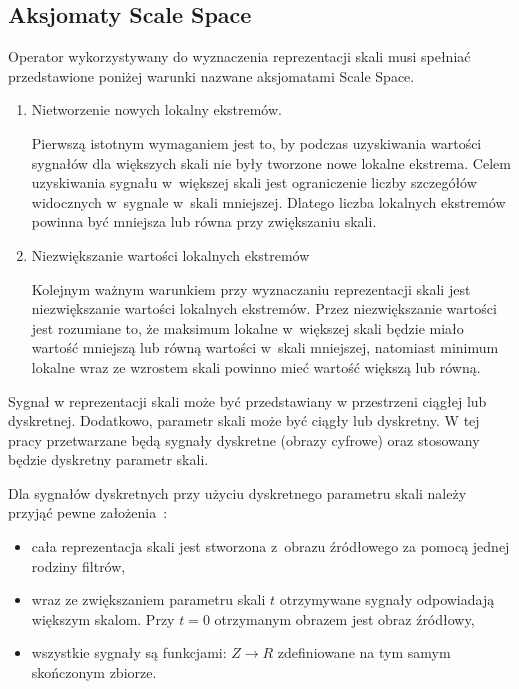 \subsection{Aksjomaty Scale Space}
\label{subsec:aksjomaty}

Operator wykorzystywany do wyznaczenia reprezentacji skali musi spełniać przedstawione poniżej warunki nazwane aksjomatami Scale Space\cite{ScaleSpaceAxioms}. 

\begin{enumerate}
\item Nietworzenie nowych lokalny ekstremów.

Pierwszą istotnym wymaganiem jest to, by podczas uzyskiwania wartości sygnałów dla większych skali nie były tworzone nowe lokalne ekstrema. Celem uzyskiwania sygnału w~większej skali jest ograniczenie liczby szczegółów widocznych w~sygnale w~skali mniejszej. Dlatego liczba lokalnych ekstremów powinna być mniejsza lub równa przy zwiększaniu skali.

\item Niezwiększanie wartości lokalnych ekstremów

Kolejnym ważnym warunkiem przy wyznaczaniu reprezentacji skali jest niezwiększanie wartości lokalnych ekstremów. Przez niezwiększanie wartości jest rozumiane to, że maksimum lokalne w~większej skali będzie miało wartość mniejszą lub równą wartości w~skali mniejszej, natomiast minimum lokalne wraz ze wzrostem skali powinno mieć wartość większą lub równą.

\end{enumerate}

Sygnał w reprezentacji skali może być przedstawiany w przestrzeni ciągłej lub dyskretnej. Dodatkowo, parametr skali może być ciągły lub dyskretny. W tej pracy przetwarzane będą sygnały dyskretne (obrazy cyfrowe) oraz stosowany będzie dyskretny parametr skali.

Dla sygnałów dyskretnych przy użyciu dyskretnego parametru skali należy przyjąć pewne założenia~\cite{SSFDS}:
\begin{itemize}
\item cała reprezentacja skali jest stworzona z~obrazu źródłowego za pomocą jednej rodziny filtrów,
\item wraz ze zwiększaniem parametru skali $ t $ otrzymywane sygnały odpowiadają większym skalom. Przy $ t = 0 $ otrzymanym obrazem jest obraz źródłowy,
\item wszystkie sygnały są funkcjami: $ Z \rightarrow R $ zdefiniowane na tym samym skończonym zbiorze.
\end{itemize}

